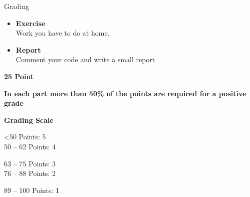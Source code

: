 \documentclass[aspectratio=169]{beamer}
\begin{document}
\begin{frame}{Grading}
\begin{minipage}[t][9.5cm]{\textwidth}
\begin{minipage}[t]{0.32\textwidth}
\begin{coloredblock}
\begin{itemize}
                    \item \footnotesize \textbf{Exercise}\\
                    Work you have to do at home.
                    \item \footnotesize \textbf{Report}\\
                    Comment your code and write a small report
                \end{itemize}
            \end{coloredblock}
            \centering \footnotesize \textbf{25 Point}
        \end{minipage}
    \end{minipage}
    
    \begin{coloredblock}[yellow]
        \centering\footnotesize\textbf{In each part more than 50\% of the points are required for a positive grade}
    \end{coloredblock}

    \vspace{0.2cm}
    \begin{coloredblock}[green]
        \begin{minipage}[c]{0.24\textwidth}
            \centering\footnotesize \textbf{Grading Scale}
        \end{minipage}
        \hfill
        \begin{minipage}[c]{0.24\textwidth}
            \footnotesize
            <50 Points:         5\\
            50 – 62 Points:     4
        \end{minipage}
        \hfill
        \begin{minipage}[c]{0.24\textwidth}
            \footnotesize
            63 – 75 Points:     3\\
            76 – 88 Points:     2
        \end{minipage}
        \hfill
        \begin{minipage}[t]{0.24\textwidth}
            \footnotesize
            89 – 100 Points:    1
        \end{minipage}
        
    \end{coloredblock}


\end{frame}
\end{document}
